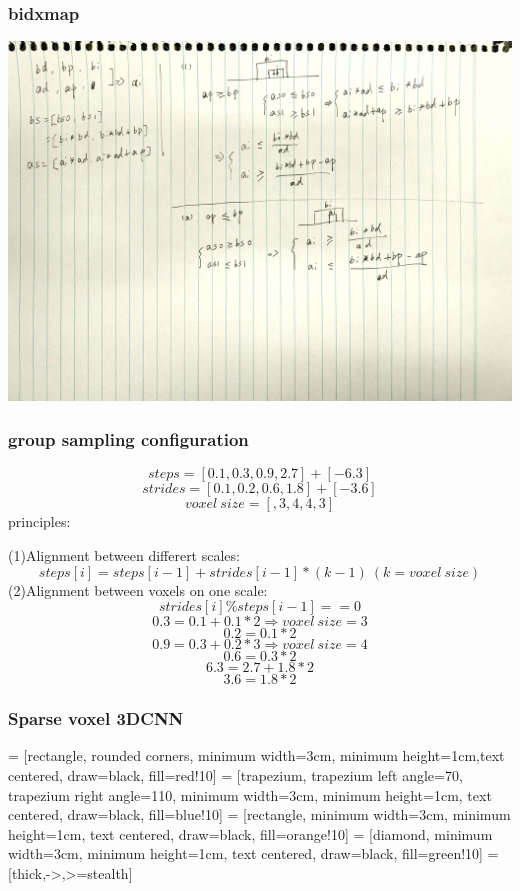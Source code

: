 \documentclass{article}
\begin{document}
\subsubsection{bidxmap}
\includegraphics[width=\textheight]{theory/bxmap.png}

\subsubsection{group sampling configuration}
$$ steps = [0.1,0.3,0.9,2.7] + [-6.3]$$
$$ strides = [0.1,0.2,0.6,1.8] + [-3.6] $$
$$ voxel\ size=[, 3, 4, 4, 3] $$
principles:\par
(1)Alignment between differert scales:
$$ steps[i] = steps[i-1]+strides[i-1]*(k-1)\  (k=voxel\ size) $$
(2)Alignment between voxels on one scale:
$$ strides[i] \% steps[i-1] == 0 $$
$$ 0.3=0.1+0.1*2 \Rightarrow voxel\ size=3 $$
$$ 0.2=0.1*2 $$
$$ 0.9=0.3+0.2*3 \Rightarrow voxel\ size=4 $$ 
$$ 0.6=0.3*2 $$
$$$$
$$ 6.3=2.7+1.8*2 $$
$$ 3.6=1.8*2 $$

\subsubsection{Sparse voxel 3DCNN }
 = [rectangle, rounded corners, minimum width=3cm, minimum height=1cm,text centered, draw=black, fill=red!10]
 = [trapezium, trapezium left angle=70, trapezium right angle=110, minimum width=3cm, minimum height=1cm, text centered, draw=black, fill=blue!10]
 = [rectangle, minimum width=3cm, minimum height=1cm, text centered, draw=black, fill=orange!10]
 = [diamond, minimum width=3cm, minimum height=1cm, text centered, draw=black, fill=green!10]
 = [thick,->,>=stealth]
\end{document}
